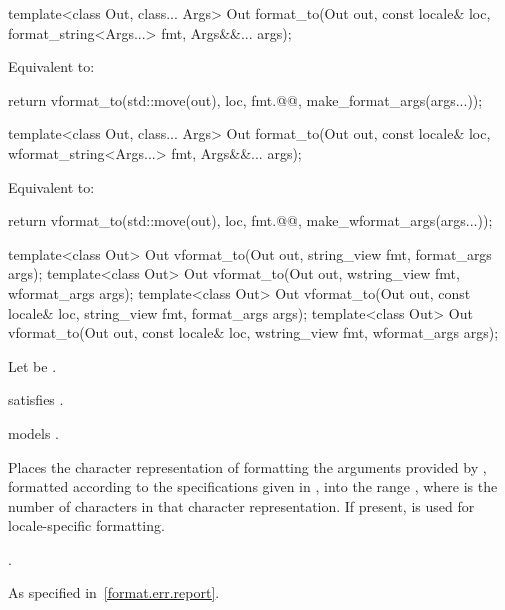 %
\begin{itemdecl}
template<class Out, class... Args>
  Out format_to(Out out, const locale& loc, format_string<Args...>  fmt, Args&&... args);
\end{itemdecl}

\begin{itemdescr}
\pnum
\effects
Equivalent to:
\begin{codeblock}
return vformat_to(std::move(out), loc, fmt.@@, make_format_args(args...));
\end{codeblock}
\end{itemdescr}

%
\begin{itemdecl}
template<class Out, class... Args>
  Out format_to(Out out, const locale& loc, wformat_string<Args...> fmt, Args&&... args);
\end{itemdecl}

\begin{itemdescr}
\pnum
\effects
Equivalent to:
\begin{codeblock}
return vformat_to(std::move(out), loc, fmt.@@, make_wformat_args(args...));
\end{codeblock}
\end{itemdescr}

%
\begin{itemdecl}
template<class Out>
  Out vformat_to(Out out, string_view fmt, format_args args);
template<class Out>
  Out vformat_to(Out out, wstring_view fmt, wformat_args args);
template<class Out>
  Out vformat_to(Out out, const locale& loc, string_view fmt, format_args args);
template<class Out>
  Out vformat_to(Out out, const locale& loc, wstring_view fmt, wformat_args args);
\end{itemdecl}

\begin{itemdescr}
\pnum
Let  be .

\pnum
\constraints
{} satisfies .

\pnum
\expects
{} models .

\pnum
\effects
Places the character representation of formatting
the arguments provided by ,
formatted according to the specifications given in ,
into the range ,
where  is the number of characters in that character representation.
If present,  is used for locale-specific formatting.

\pnum
\returns
{}.

\pnum
\throws
As specified in~\ref{format.err.report}.
\end{itemdescr}

